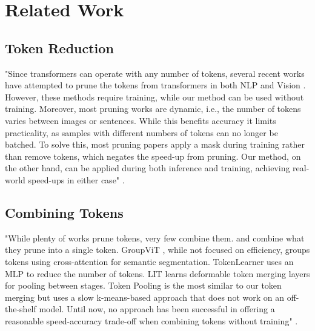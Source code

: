 \section{Related Work}

\subsection*{Token Reduction}
"Since transformers can operate with any number of tokens, several recent works
have attempted to prune the tokens from transformers in both NLP \cite{goyal2020power, kim2020length, kim2022learned, lassance2021study} and Vision \cite{meng2022adavit, yin2022vit, kong2021spvit, song2022cp, rao2021dynamicvit, fayyaz2022adaptive, yu2023unified}. However,
these methods require training, while our method can be used without training. Moreover, most
pruning works are dynamic, i.e., the number of tokens varies between images or sentences. While this
benefits accuracy it limits practicality, as samples with different numbers of tokens can no longer be
batched. To solve this, most pruning papers apply a mask during training rather than remove tokens,
which negates the speed-up from pruning. Our method, on the other hand, can be applied during both
inference and training, achieving real-world speed-ups in either case" \cite{bolya2023tome}.

\subsection*{Combining Tokens}
"While plenty of works prune tokens, very few combine them. \cite{kong2021spvit} and \cite{liang2022not} combine what they prune into a single token. GroupViT \cite{xu2022groupvit}, while not focused on efficiency, groups tokens using cross-attention for semantic segmentation. TokenLearner \cite{ryoo2021tokenlearner} uses an MLP to reduce the number of tokens. LIT \cite{pan2022less} learns deformable token merging layers for pooling between stages. Token Pooling \cite{marin2021token} is the most similar to our token merging but uses a slow k-means-based approach that does not work on an off-the-shelf model. Until now, no approach has been successful in offering a reasonable speed-accuracy trade-off when combining tokens without training" \cite{bolya2023tome}.
